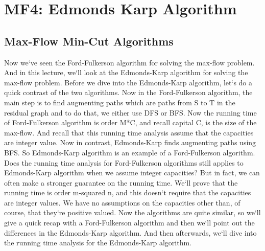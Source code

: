 \section{MF4: Edmonds Karp Algorithm}

\subsection{Max-Flow Min-Cut Algorithms}
Now we`ve seen the Ford-Fulkerson algorithm for solving the max-flow problem.
And in this lecture, we`ll look at the Edmonds-Karp algorithm for solving the max-flow problem.
Before we dive into the Edmonds-Karp algorithm, let`s do a quick contrast of the two algorithms.
Now in the Ford-Fulkerson algorithm, the main step is to find augmenting paths which are paths from S to T in the residual graph and to do that, we either use DFS or BFS\@.
Now the running time of Ford-Fulkerson algorithm is order M*C, and recall capital C, is the size of the max-flow.
And recall that this running time analysis assume that the capacities are integer value.
Now in contrast, Edmonds-Karp finds augmenting paths using BFS\@.
So Edmonds-Karp algorithm is an example of a Ford-Fulkerson algorithm.
Does the running time analysis for Ford-Fulkerson algorithms still applies to Edmonds-Karp algorithm when we assume integer capacities? But in fact, we can often make a stronger guarantee on the running time.
We`ll prove that the running time is order m-squared n, and this doesn`t require that the capacities are integer values.
We have no assumptions on the capacities other than, of course, that they`re positive valued.
Now the algorithms are quite similar, so we`ll give a quick recap with a Ford-Fulkerson algorithm and then we`ll point out the differences in the Edmonds-Karp algorithm.
And then afterwards, we`ll dive into the running time analysis for the Edmonds-Karp algorithm.

